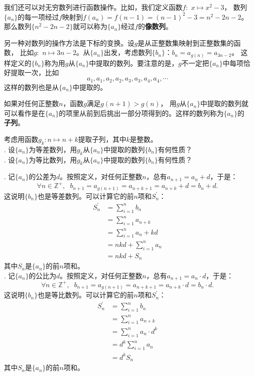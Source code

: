 \documentclass[12pt,UTF8,fontset=none]{ctexbook}
\begin{document}
我们还可以对无穷数列进行函数操作。比如，我们定义函数$f:\,\,x\mapsto x^2 - 3$，
数列$\{a_n\}$的每一项经过$f$映射到$f(a_n) = f(n-1) = (n-1)^2 - 3 = n^2 - 2n - 2$。
那么数列$\{n^2-2n-2\}$就可以称为$\{a_n\}$经过$f$的\textbf{像数列}。

另一种对数列的操作方法是下标的变换。设$g$是从正整数集映射到正整数集的函数，
比如$g:\,\, n \mapsto 3n - 2$。从$\{a_n\}$出发，考虑数列$\{b_n\}$：$b_n = a_{g(n)} = a_{3n-2}$。
这样定义的$\{b_n\}$称为用$g$从$\{a_n\}$中提取的数列。要注意的是，$g$不一定把$\{a_n\}$中每项恰好提取一次，比如
$$ a_1, a_1, a_2, a_2, a_3, a_3, a_4, a_4, \cdots $$
这样的数列也是从$\{a_n\}$中提取的。

如果对任何正整数$n$，函数$g$满足$g(n+1) > g(n)$，
用$g$从$\{a_n\}$中提取的数列就可以看作是在$\{a_n\}$的项里从前到后挑出一部分项得到的。这样的数列称为$\{a_n\}$的\textbf{子列}。

\begin{et}
    考虑用函数$g_k: n\mapsto n + k$提取子列，其中$k$是整数。\\
    . 设$\{a_n\}$为等差数列，用$g_k$从$\{a_n\}$中提取的数列$\{b_n\}$有何性质？\\
    . 设$\{a_n\}$为等比数列，用$g_k$从$\{a_n\}$中提取的数列$\{b_n\}$有何性质？
\end{et}
\begin{so}
    . 记$\{a_n\}$的公差为$d$。按照定义，对任何正整数$n$，总有$a_{n+1} = a_n + d$，于是：
    $$ \forall n\in \mathbb{Z}^+, \;\,\, b_{n+1} = a_{g(n+1)} = a_{n+k+1} = a_{n+k} + d = b_n + d.$$
    这说明$\{b_n\}$也是等差数列。可以计算它的前$n$项和$S_n^\prime$：
    \begin{align*}
        S_n^\prime &= \sum_{i=1}^n b_n  \\
            &= \sum_{i=1}^n a_{n+k}  \\
            &= \sum_{i=1}^n a_{n} + kd  \\
            &= nkd + \sum_{i=1}^n a_{n}  \\
            &= nkd + S_n 
    \end{align*}
    其中$S_n$是$\{a_n\}$的前$n$项和。\\
    . 记$\{a_n\}$的公比为$d$。按照定义，对任何正整数$n$，总有$a_{n+1} = a_n \cdot d$，于是：
    $$ \forall n\in \mathbb{Z}^+, \;\,\, b_{n+1} = a_{g(n+1)} = a_{n+k+1} = a_{n+k} \cdot d = b_n \cdot d.$$
    这说明$\{b_n\}$也是等比数列。可以计算它的前$n$项和$S_n^\prime$：
    \begin{align*}
        S_n^\prime &= \sum_{i=1}^n b_n  \\
            &= \sum_{i=1}^n a_{n+k}  \\
            &= \sum_{i=1}^n a_{n} \cdot d^k  \\
            &= d^k \sum_{i=1}^n a_{n}  \\
            &= d^k S_n 
    \end{align*}
    其中$S_n$是$\{a_n\}$的前$n$项和。\\
\end{so}
\end{document}

